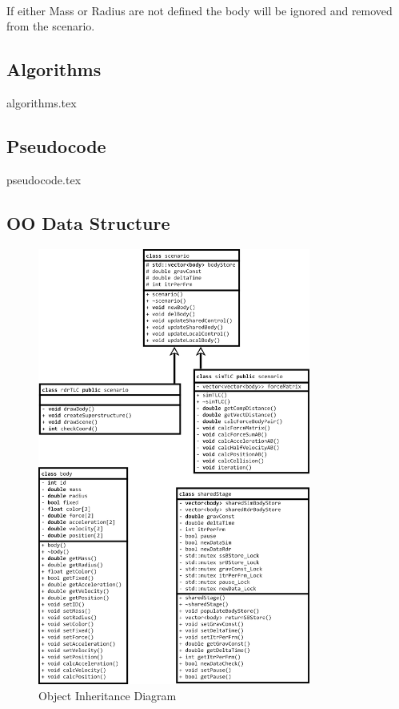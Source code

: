 \paragraph{}
If either Mass or Radius are not defined the body will be ignored and removed from the scenario.

\pagebreak
\subsection{Algorithms}
{algorithms.tex}

\pagebreak
\subsection{Pseudocode}
{pseudocode.tex}

\pagebreak
\subsection{OO Data Structure}
\begin{figure}[!ht]
  \centering
  \includegraphics[width=0.8\textwidth]{img/did.png}
  \caption{Object Inheritance Diagram}
\end{figure}

